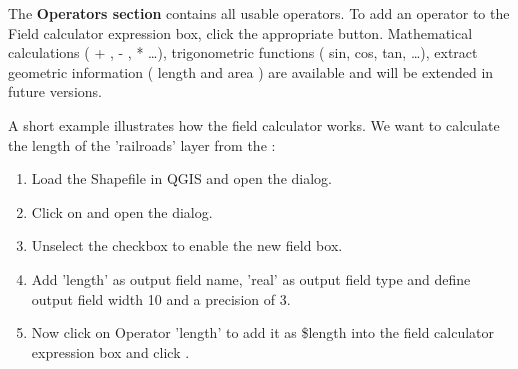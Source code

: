 The \textbf{Operators section} contains all usable operators. To add an operator
to the Field calculator expression box, click the appropriate button. Mathematical 
calculations ( + , - , * \dots), trigonometric functions ( sin, cos, tan, \dots), 
extract geometric information ( length and area ) are available and will be 
extended in future versions.

A short example illustrates how the field calculator works. We want to calculate 
the length of the 'railroads' layer from the :

\begin{enumerate}
\item Load the Shapefile  in QGIS and open 
the  dialog. 
\item Click on  and 
open the  dialog.
\item Unselect the  checkbox to enable the 
new field box.
\item Add 'length' as output field name, 'real' as output field type and define 
output field width 10 and a precision of 3.
\item Now click on Operator 'length' to add it as \$length into the 
field calculator expression box and click .
\end{enumerate}

